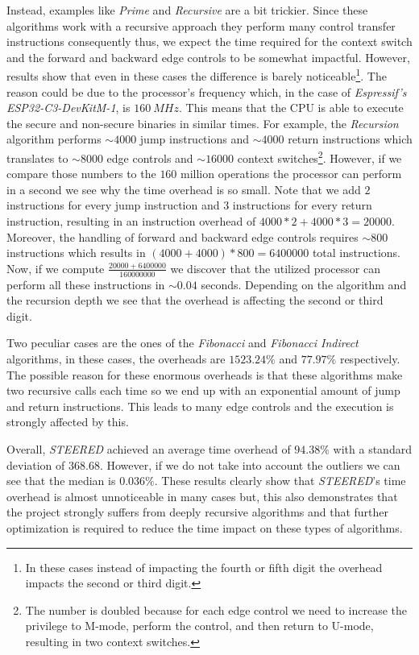 Instead, examples like \textit{Prime} and \textit{Recursive} are a bit trickier.
Since these algorithms work with a recursive approach they perform many control transfer
instructions consequently thus, we expect the time required for the context
switch and the forward and backward edge controls to be somewhat impactful. However,
results show that even in these cases the difference is barely noticeable\footnote{In
these cases instead of impacting the fourth or fifth digit the overhead impacts
the second or third digit.}. The reason could be due to the processor's
frequency which, in the case of \textit{Espressif's ESP32-C3-DevKitM-1}, is $160
\ MHz$. This means that the CPU is able to execute the secure and non-secure
binaries in similar times. For example, the \textit{Recursion} algorithm performs
$\sim 4000$ jump instructions and $\sim 4000$ return instructions which translates
to $\sim 8000$ edge controls and $\sim 16000$ context switches\footnote{The
number is doubled because for each edge control we need to increase the
privilege to M-mode, perform the control, and then return to U-mode, resulting in
two context switches.}. However, if we compare those numbers to the $160$
million operations the processor can perform in a second we see why the time
overhead is so small. Note that we add $2$ instructions for every jump instruction
and $3$ instructions for every return instruction, resulting in an instruction
overhead of $4000*2 + 4000*3 = 20000$. Moreover, the handling of forward and
backward edge controls requires $\sim 800$ instructions which results in
$(4000 + 4000) * 800 = 6400000$ total instructions. Now, if we compute
$\frac{20000 + 6400000}{160000000}$ we discover that the utilized processor can
perform all these instructions in $\sim 0.04$ seconds. Depending on the algorithm
and the recursion depth we see that the overhead is affecting the second or third
digit.

Two peculiar cases are the ones of the \textit{Fibonacci} and \textit{Fibonacci
Indirect} algorithms, in these cases, the overheads are $1523.24\%$ and $77.97\%$
respectively. The possible reason for these enormous overheads is that these
algorithms make two recursive calls each time so we end up with an exponential
amount of jump and return instructions. This leads to many edge controls and the
execution is strongly affected by this.

Overall, \textit{STEERED} achieved an average time overhead of $94.38\%$ with a standard
deviation of $368.68$. However, if we do not take into account the outliers we can
see that the median is $0.036\%$. These results clearly show that \textit{STEERED}'s
time overhead is almost unnoticeable in many cases but, this also demonstrates
that the project strongly suffers from deeply recursive algorithms and that
further optimization is required to reduce the time impact on these types of
algorithms.

